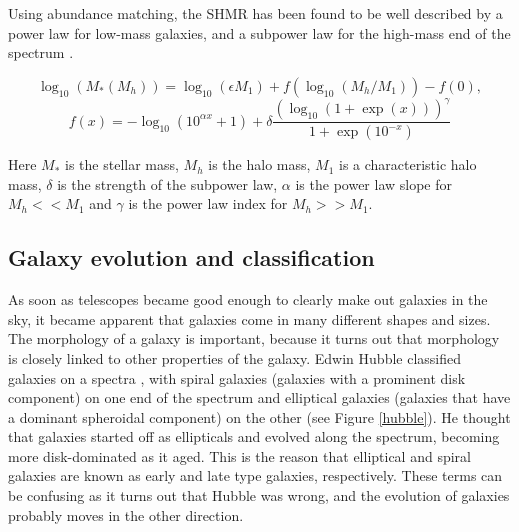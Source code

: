 Using abundance matching, the SHMR has been found to be well described by a power law for low-mass galaxies, and a subpower law for the high-mass end of the spectrum \parencite{Behroozi2013}. 

\begin{equation}
    \log_{10}(M_*(M_h)) = \log_{10}(\epsilon M_1) + f(\log_{10}(M_h/M_1)) -f(0),
\end{equation}
\begin{equation*}
    f(x) = -\log_{10}(10^{\alpha x}+1)+\delta \frac{(\log_{10}(1+\exp(x)))^\gamma}{1 +\exp(10^{-x})}
\end{equation*}

Here $M_*$ is the stellar mass, $M_h$ is the halo mass, $M_1$ is a characteristic halo mass, $\delta$ is the strength of the subpower law, $\alpha$ is the power law slope for $M_h << M_1$ and $\gamma$ is the power law index for $M_h >> M_1$.


\subsection{Galaxy evolution and classification}
As soon as telescopes became good enough to clearly make out galaxies in the sky, it became apparent that galaxies come in many different shapes and sizes. The morphology of a galaxy is important, because it turns out that morphology is closely linked to other properties of the galaxy. Edwin Hubble classified galaxies on a spectra \parencite{Hubble1926}, with spiral galaxies (galaxies with a prominent disk component) on one end of the spectrum and elliptical galaxies (galaxies that have a dominant spheroidal component) on the other (see Figure \ref{hubble}). He thought that galaxies started off as ellipticals and evolved along the spectrum, becoming more disk-dominated as it aged. This is the reason that elliptical and spiral galaxies are known as early and late type galaxies, respectively. These terms can be confusing as it turns out that Hubble was wrong, and the evolution of galaxies probably moves in the other direction. 

